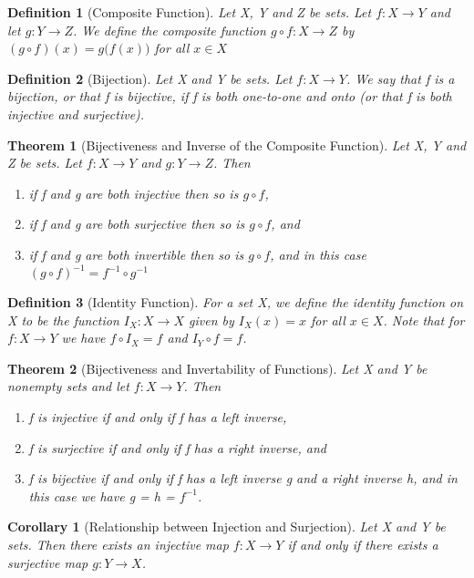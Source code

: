 \documentclass[11pt, oneside]{book}
\theoremstyle{break}
\newtheorem{thm}{Theorem}[section]
\newtheorem{crly}{Corollary}[thm]
\newtheorem{defn}{Definition}[section]
\begin{document}
\begin{defn}[Composite Function]
	Let X, Y and Z be sets. Let $f: X \to Y$ and let $g: Y \to Z$. We define the composite function $g \circ f: X \to Z$ by $(g \circ f)(x) = g \big( f(x) \big)$ for all $x \in X$
\end{defn}

\begin{defn}[Bijection]
	Let X and Y be sets. Let $f: X \to Y$. We say that f is a bijection, or that f is bijective, if f is both one-to-one and onto (or that f is both injective and surjective).
\end{defn}

\begin{thm}[Bijectiveness and Inverse of the Composite Function]
	Let X, Y and Z be sets. Let $f: X \to Y$ and $g: Y \to Z$. Then
	\begin{enumerate}
		\item if f and g are both injective then so is $g \circ f$,
		\item if f and g are both surjective then so is $g \circ f$, and
		\item if f and g are both invertible then so is $g \circ f$, and in this case $(g \circ f)^{-1} = f^{-1} \circ g^{-1}$
	\end{enumerate}
\end{thm}

\begin{defn}[Identity Function]
	For a set X, we define the identity function on X to be the function $I_X: X \to X$ given by $I_X(x) = x$ for all $x \in X$. Note that for $f: X \to Y$ we have $f \circ I_X = f$ and $I_Y \circ f = f$.
\end{defn}

\begin{thm}[Bijectiveness and Invertability of Functions]
	Let X and Y be nonempty sets and let $f: X \to Y$. Then
	\begin{enumerate}
		\item f is injective if and only if f has a left inverse,
		\item f is surjective if and only if f has a right inverse, and
		\item f is bijective if and only if f has a left inverse g and a right inverse h, and in this case we have g = h = $f^{-1}$.
	\end{enumerate}
\end{thm}

\begin{crly}[Relationship between Injection and Surjection]
	Let X and Y be sets. Then there exists an injective map $f: X \to Y$ if and only if there exists a surjective map $g: Y \to X$.
\end{crly}
\end{document}
